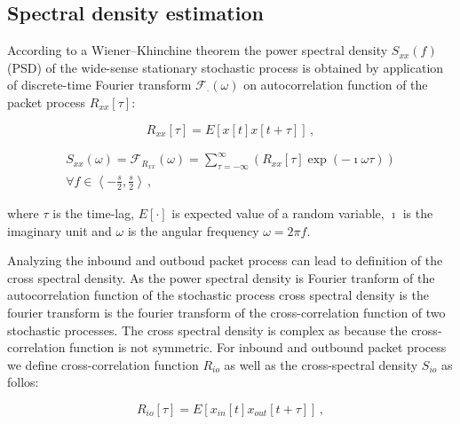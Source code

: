 \subsection{Spectral density estimation}

According to a Wiener–Khinchine %
theorem the power spectral density $S_{xx}(f)$ (PSD) of the wide-sense stationary 
stochastic process is obtained by application of discrete-time 
Fourier transform $\mathcal{F}_{\cdot}(\omega)$ on autocorrelation function 
of the packet process $R_{xx}\left[\tau\right]$:

\begin{equation}\label{eq:corr}
R_{xx}\left[\tau\right] = E[x\left[t\right]x\left[t+\tau\right]]\, , 
\end{equation}

\begin{equation}\label{eq:psd}
\begin{split}
S_{xx}(\omega) = \mathcal{F}_{R_{xx}}\left(\omega\right) = \sum_{\tau=-\infty}^{\infty} 
\left( R_{xx}\left[\tau\right] \exp\left( -\imath \omega\tau \right)\right) \\ 
\forall f \in \left\langle -\frac{s}{2},\frac{s}{2} \right\rangle\, , 
\end{split}
\end{equation}

where $\tau$ is the time-lag, $E\left[\cdot\right]$ is expected value of a random variable, $\imath$
is the imaginary unit and $\omega$ is the angular frequency $\omega= 2\pi f$. 

Analyzing the inbound and outboud packet process can lead to definition of the cross spectral
density\cite{penny2000signal}.
As the power spectral density is Fourier tranform of the autocorrelation function of the 
stochastic process cross spectral density is the fourier transform is the fourier transform
of the cross-correlation function of two stochastic processes. The cross spectral density is
complex as because the cross-correlation function is not symmetric. 
For inbound and outbound packet process we define cross-correlation function $R_{io}$ 
as well as the cross-spectral density $S_{io}$ as follos:

\begin{equation}\label{eq:xcorr}
R_{io}\left[\tau\right] = E[x_{in}\left[t\right]x_{out}\left[t+\tau\right]]\, , 
\end{equation}

